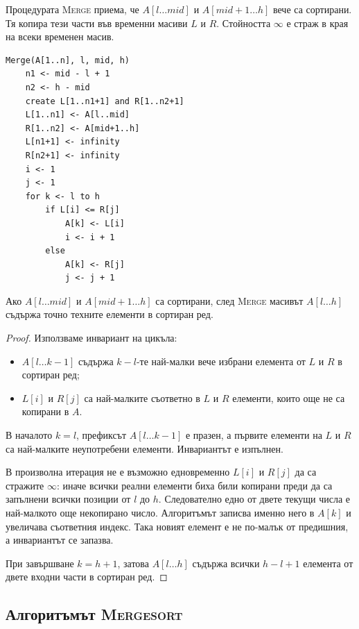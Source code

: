 Процедурата \textsc{Merge} приема, че $A[l\ldots mid]$ и $A[mid+1\ldots h]$ вече са сортирани. Тя копира тези части във временни масиви $L$ и $R$. Стойността $\infty$ е страж в края на всеки временен масив.

\begin{verbatim}
Merge(A[1..n], l, mid, h)
    n1 <- mid - l + 1
    n2 <- h - mid
    create L[1..n1+1] and R[1..n2+1]
    L[1..n1] <- A[l..mid]
    R[1..n2] <- A[mid+1..h]
    L[n1+1] <- infinity
    R[n2+1] <- infinity
    i <- 1
    j <- 1
    for k <- l to h
        if L[i] <= R[j]
            A[k] <- L[i]
            i <- i + 1
        else
            A[k] <- R[j]
            j <- j + 1
\end{verbatim}

\begin{thm}
Ако $A[l\ldots mid]$ и $A[mid+1\ldots h]$ са сортирани, след \textsc{Merge} масивът $A[l\ldots h]$ съдържа точно техните елементи в сортиран ред.
\end{thm}

\begin{proof}
Използваме инвариант на цикъла:

\begin{itemize}
    \item $A[l\ldots k-1]$ съдържа $k-l$-те най-малки вече избрани елемента от $L$ и $R$ в сортиран ред;
    \item $L[i]$ и $R[j]$ са най-малките съответно в $L$ и $R$ елементи, които още не са копирани в $A$.
\end{itemize}

В началото $k=l$, префиксът $A[l\ldots k-1]$ е празен, а първите елементи на $L$ и $R$ са най-малките неупотребени елементи. Инвариантът е изпълнен.

В произволна итерация не е възможно едновременно $L[i]$ и $R[j]$ да са стражите $\infty$: иначе всички реални елементи биха били копирани преди да са запълнени всички позиции от $l$ до $h$. Следователно едно от двете текущи числа е най-малкото още некопирано число. Алгоритъмът записва именно него в $A[k]$ и увеличава съответния индекс. Така новият елемент е не по-малък от предишния, а инвариантът се запазва.

При завършване $k=h+1$, затова $A[l\ldots h]$ съдържа всички $h-l+1$ елемента от двете входни части в сортиран ред.
\end{proof}

\subsection{Алгоритъмът \textsc{Mergesort}}\label{s:6.6.3}

